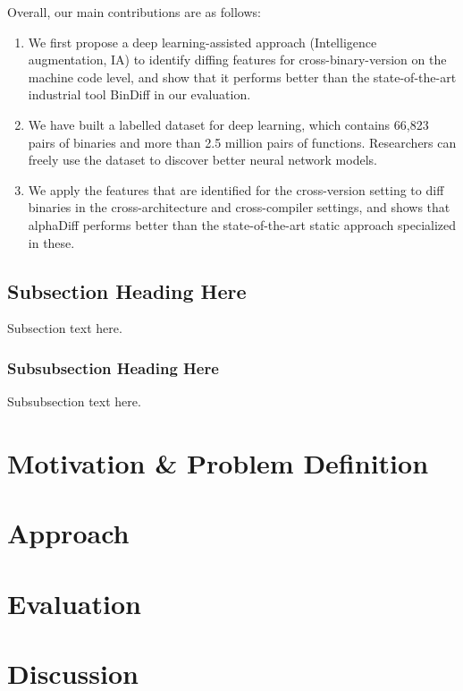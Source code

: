 \documentclass[10pt,conference]{IEEEtran}
\begin{document}
Overall, our main contributions are as follows:
\begin{enumerate}
\item We first propose a deep learning-assisted approach (Intelligence augmentation, IA) to identify diffing features for cross-binary-version on the machine code level, 
and show that it performs better than the state-of-the-art industrial tool BinDiff in our evaluation.

\item We have built a labelled dataset for deep learning, which contains 66,823 pairs of binaries and more than 2.5 million pairs of functions. 
Researchers can freely use the dataset to discover better neural network models.

\item We apply the features that are identified for the cross-version setting to diff binaries in the cross-architecture and cross-compiler settings, 
and shows that alphaDiff performs better than the state-of-the-art static approach specialized in these.
\end{enumerate}

\subsection{Subsection Heading Here}
Subsection text here.


\subsubsection{Subsubsection Heading Here}
Subsubsection text here.

\section{Motivation \& Problem Definition}

\section{Approach}

\section{Evaluation}

\section{Discussion}
\end{document}
